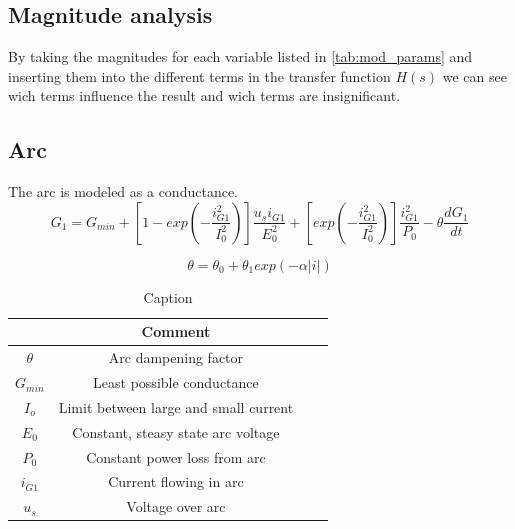 \subsection{Magnitude analysis}
By taking the magnitudes for each variable listed in \cref{tab:mod_params} and inserting them into the different terms in the transfer function $H(s)$ we can see wich terms influence the result and wich terms are insignificant.

\subsection{Arc}
The arc is modeled as a conductance.
\begin{equation} \label{eq:g1}
    G_1 = G_{min} + [ 1 - exp(-\frac{i_{G1}^2}{I_0^2})] \frac{u_s i_{G1}}{E_0^2} + [exp(-\frac{i_{G1}^2}{I_0^2})] \frac{i_{G1}^2}{P_0} - \theta \frac{d G_1}{dt}
\end{equation}

\begin{equation}
    \theta = \theta_0 + \theta_1 exp(-\alpha |i|)
\end{equation}

\begin{table}[h]
    \centering
    \begin{tabular}{c|c|c|c}
         & Comment &  &\\ \hline
        $\theta$  & Arc dampening factor &  &\\
        $G_{min}$ & Least possible conductance &  &\\
        $I_o$     & Limit between large and small current &  &\\
        $E_0$     & Constant, steasy state arc voltage &  &\\
        $P_0$     & Constant power loss from arc &  & \\
        $i_{G1}$  & Current flowing in arc      &  & \\
        $u_s$     & Voltage over arc            &  &
    \end{tabular}
    \caption{Caption}
    \label{tab:my_label}
\end{table}
